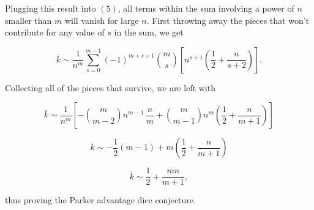 \documentclass[12pt]{article}
\begin{document}
Plugging this result into $(5)$, all terms within the sum involving a power of $n$ smaller than $m$ will vanish for large $n$. First throwing away the pieces that won't contribute for any value of $s$ in the sum, we get

\begin{equation}
    \overline{k}
    \sim \frac{1}{n^m} \sum_{s=0}^{m-1} {\left(-1\right)}^{m+s+1} \binom{m}{s} \left[n^{s+1} \left(\frac{1}{2} + \frac{n}{s+2}\right) \right].
\end{equation}

Collecting all of the pieces that survive, we are left with

\begin{equation}
    \overline{k}
    \sim \frac{1}{n^m} \left[-\binom{m}{m-2} n^{m-1} \, \frac{n}{m} + \binom{m}{m-1} n^m \left(\frac{1}{2} + \frac{n}{m+1}\right)\right]
\end{equation}

\begin{equation}
    \overline{k}
    \sim -\frac{1}{2} \left(m-1\right) + m \left(\frac{1}{2} + \frac{n}{m+1}\right)
\end{equation}

\begin{equation}
    \overline{k}
    \sim \frac{1}{2} + \frac{mn}{m+1},
\end{equation}

thus proving the Parker advantage dice conjecture.
\end{document}
